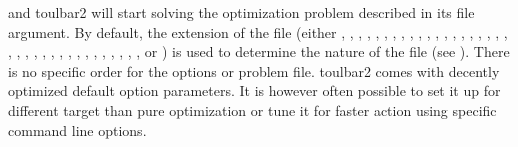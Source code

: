 \documentclass[letterpaper,10pt,openany,oneside,english]{sphinxmanual}
\begin{document}
\sphinxAtStartPar
and toulbar2 will start solving the optimization problem described in its file argument. By default, the extension of the file (either , , , , , , , , , , , , , , , , , , , , , , , , , , , , , , , , , , , ,  or ) is used to determine the nature of the file (see {\hyperref[\detokenize{userdoc:input-formats}]{}}).
There is no specific order for the options or problem file. toulbar2 comes with decently optimized default option parameters. It is however often possible to set it up for different target than pure optimization or tune it for faster action using specific command line options.
\end{document}
